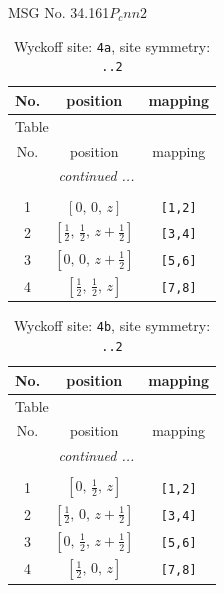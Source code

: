 \documentclass[fleqn,8pt]{jsarticle}
\begin{document}
\setcounter{MaxMatrixCols}{32}

\renewcommand{\tablename}{Table~}
\renewcommand{\figurename}{Figure~}
\begin{center}
\LARGE
MSG No. 34.161\quad$P_{c}nn2$
\end{center}
\renewcommand{\arraystretch}{1.2}
\begin{longtable}{ccc}
\caption{Wyckoff site: {\tt 4a}, site symmetry: {\tt ..2}}
 \\
 \hline \hline
No. & position & mapping \\ \hline \endfirsthead

\multicolumn{2}{l}{\tablename\ \thetable{}} \\
 \hline \hline
No. & position & mapping \\ \hline \endhead

 \hline \hline
\multicolumn{2}{r}{\footnotesize\it continued ...} \\ \endfoot

 \hline \hline
\multicolumn{2}{r}{} \\ \endlastfoot

1 & $\left[ 0,\, 0,\, z \right]$ & {\tt [1,2]} \\ \hline
2 & $\left[ \frac{1}{2},\, \frac{1}{2},\, z + \frac{1}{2} \right]$ & {\tt [3,4]} \\ \hline
3 & $\left[ 0,\, 0,\, z + \frac{1}{2} \right]$ & {\tt [5,6]} \\ \hline
4 & $\left[ \frac{1}{2},\, \frac{1}{2},\, z \right]$ & {\tt [7,8]} \\
\end{longtable}
\renewcommand{\arraystretch}{1.2}
\begin{longtable}{ccc}
\caption{Wyckoff site: {\tt 4b}, site symmetry: {\tt ..2}}
 \\
 \hline \hline
No. & position & mapping \\ \hline \endfirsthead

\multicolumn{2}{l}{\tablename\ \thetable{}} \\
 \hline \hline
No. & position & mapping \\ \hline \endhead

 \hline \hline
\multicolumn{2}{r}{\footnotesize\it continued ...} \\ \endfoot

 \hline \hline
\multicolumn{2}{r}{} \\ \endlastfoot

1 & $\left[ 0,\, \frac{1}{2},\, z \right]$ & {\tt [1,2]} \\ \hline
2 & $\left[ \frac{1}{2},\, 0,\, z + \frac{1}{2} \right]$ & {\tt [3,4]} \\ \hline
3 & $\left[ 0,\, \frac{1}{2},\, z + \frac{1}{2} \right]$ & {\tt [5,6]} \\ \hline
4 & $\left[ \frac{1}{2},\, 0,\, z \right]$ & {\tt [7,8]} \\
\end{longtable}
\end{document}
